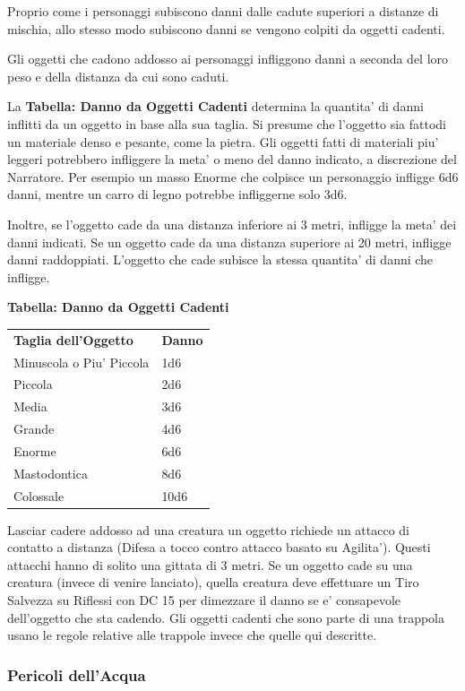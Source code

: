 \documentclass[a4paper,11pt,twoside,openany]{book}
\begin{document}
{\label{oggetti-cadenti}

Proprio come i personaggi subiscono danni dalle cadute superiori a distanze di mischia, allo stesso modo subiscono danni se vengono colpiti da oggetti cadenti.

Gli oggetti che cadono addosso ai personaggi infliggono danni a seconda del loro peso e della distanza da cui sono caduti.

La \textbf{Tabella: Danno da Oggetti Cadenti} determina la quantita' di danni inflitti da un oggetto in base alla sua taglia. Si presume che l'oggetto sia fattodi un materiale denso e pesante, come la pietra. 
Gli oggetti fatti di materiali piu' leggeri potrebbero infliggere la meta' o meno del danno indicato, a discrezione del Narratore. Per esempio un masso Enorme che colpisce un personaggio infligge 6d6 danni, mentre un carro di legno potrebbe infliggerne solo 3d6.

Inoltre, se l'oggetto cade da una distanza inferiore ai 3 metri, infligge la meta' dei danni indicati. Se un oggetto cade da una distanza superiore ai 20 metri, infligge danni raddoppiati. L'oggetto che cade subisce la stessa quantita' di danni che infligge.

\bigskip

\textbf{Tabella: Danno da Oggetti Cadenti}

\begin{tabular}{ll}
\toprule
\textbf{Taglia dell'Oggetto} & \textbf{Danno}\tabularnewline
Minuscola o Piu' Piccola & 1d6\tabularnewline
Piccola & 2d6\tabularnewline
Media & 3d6\tabularnewline
Grande & 4d6\tabularnewline
Enorme & 6d6\tabularnewline
Mastodontica & 8d6\tabularnewline
Colossale & 10d6\tabularnewline

\end{tabular}

\bigskip

Lasciar cadere addosso ad una creatura un oggetto richiede un attacco di contatto a distanza (Difesa a tocco contro attacco basato su Agilita'). Questi attacchi hanno di solito una gittata di 3 metri. Se un oggetto cade su una creatura (invece di venire lanciato), quella creatura deve effettuare un Tiro Salvezza su Riflessi con DC 15 per dimezzare il danno se e' consapevole dell'oggetto che sta cadendo. Gli oggetti cadenti che sono parte di una trappola usano le regole relative alle trappole invece che quelle qui descritte.

\subsubsection{Pericoli dell'Acqua}

}
\end{document}
